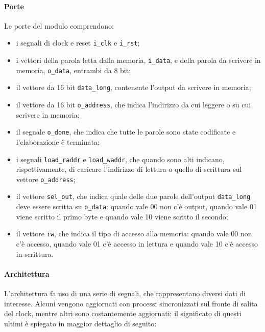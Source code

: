 \documentclass{article}
\begin{document}
			\paragraph{Porte}
			Le porte del modulo comprendono:

			\begin{itemize}
				\item i segnali di clock e reset \verb|i_clk| e \verb|i_rst|;
				\item i vettori della parola letta dalla memoria, \verb|i_data|, e della parola da
					scrivere in memoria, \verb|o_data|, entrambi da 8 bit;
				\item il vettore da 16 bit \verb|data_long|, contenente l'output da scrivere in
					memoria;
				\item il vettore da 16 bit \verb|o_address|, che indica l'indirizzo da cui leggere
					o su cui scrivere in memoria;
				\item il segnale \verb|o_done|, che indica che tutte le parole sono state
					codificate e l'elaborazione è terminata;
				\item i segnali \verb|load_raddr| e \verb|load_waddr|, che quando sono alti
					indicano, rispettivamente, di caricare l'indirizzo di lettura o quello di
					scrittura sul vettore \verb|o_address|;
				\item il vettore \verb|sel_out|, che indica quale delle due parole dell'output
					\verb|data_long| deve essere scritta su \verb|o_data|: quando vale 00 non c'è
					output, quando vale 01 viene scritto il primo byte e quando vale 10 viene
					scritto il secondo;
				\item il vettore \verb|rw|, che indica il tipo di accesso alla memoria: quando
					vale 00 non c'è accesso, quando vale 01 c'è accesso in lettura e quando vale 10
					c'è accesso in scrittura.
			\end{itemize}

			\paragraph{Architettura}
			L'architettura fa uso di una serie di segnali, che rappresentano diversi dati di
			interesse. Alcuni vengono aggiornati con processi sincronizzati sul fronte di salita
			del clock, mentre altri sono costantemente aggiornati; il significato di questi
			ultimi è spiegato in maggior dettaglio di seguito:
\end{document}
